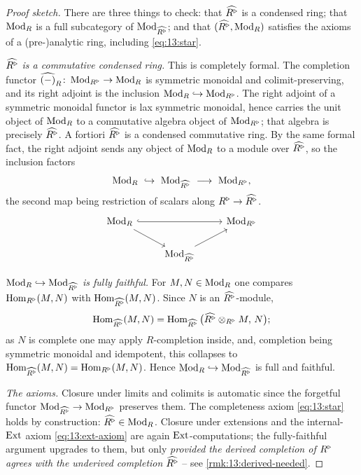 \begin{proof}[Proof sketch]
There are three things to check: that $\widehat{R^{\triangleright}}$ is a condensed ring;
that $\operatorname{Mod}_R$ is a full subcategory of $\operatorname{Mod}_{\widehat{R^{\triangleright}}}$; and that
$(\widehat{R^{\triangleright}},\operatorname{Mod}_R)$ satisfies the axioms of a (pre-)analytic ring,
including \eqref{eq:13:star}.

\emph{$\widehat{R^{\triangleright}}$ is a commutative condensed ring.} This is completely
formal. The completion functor
$\widehat{(-)}_R\colon\operatorname{Mod}_{R^{\triangleright}}\to\operatorname{Mod}_R$ is symmetric monoidal and
colimit-preserving, and its right adjoint is the inclusion
$\operatorname{Mod}_R\hookrightarrow\operatorname{Mod}_{R^{\triangleright}}$. The right adjoint of a symmetric monoidal
functor is lax symmetric monoidal, hence carries the unit object of $\operatorname{Mod}_R$ to a
commutative algebra object of $\operatorname{Mod}_{R^{\triangleright}}$; that algebra is precisely
$\widehat{R^{\triangleright}}$. A fortiori $\widehat{R^{\triangleright}}$ is a condensed commutative ring.
By the same formal fact, the right adjoint sends any object of $\operatorname{Mod}_R$ to a
module over $\widehat{R^{\triangleright}}$, so the inclusion factors
\begin{equation*}
\Mod_R\ \hookrightarrow\ \Mod_{\widehat{\ur R}}\ \longrightarrow\ \Mod_{\ur R},
\end{equation*}
the second map being restriction of scalars along $R^{\triangleright}\to\widehat{R^{\triangleright}}$.
\[
\begin{tikzcd}
\Mod_R \arrow[rr, hook] \arrow[dr] & & \Mod_{\ur R} \\
& \Mod_{\widehat{\ur R}} \arrow[ur] &
\end{tikzcd}
\]

\emph{$\operatorname{Mod}_R\hookrightarrow\operatorname{Mod}_{\widehat{R^{\triangleright}}}$ is fully faithful.} For
$M,N\in\operatorname{Mod}_R$ one compares $\operatorname{Hom}_{R^{\triangleright}}(M,N)$ with
$\operatorname{Hom}_{\widehat{R^{\triangleright}}}(M,N)$. Since $N$ is an $\widehat{R^{\triangleright}}$-module,
\[
\operatorname{Hom}_{\widehat{R^{\triangleright}}}(M,N)=\operatorname{Hom}_{\widehat{R^{\triangleright}}}\big(\widehat{R^{\triangleright}}\otimes_{R^{\triangleright}}M,\,N\big);
\]
as $N$ is complete one may apply $R$-completion inside, and, completion being
symmetric monoidal and idempotent, this collapses to $\operatorname{Hom}_{\widehat{R^{\triangleright}}}(M,N)=\operatorname{Hom}_{R^{\triangleright}}(M,N)$. Hence
$\operatorname{Mod}_R\hookrightarrow\operatorname{Mod}_{\widehat{R^{\triangleright}}}$ is full and faithful.

\emph{The axioms.} Closure under limits and colimits is automatic since the
forgetful functor $\operatorname{Mod}_{\widehat{R^{\triangleright}}}\to\operatorname{Mod}_{R^{\triangleright}}$ preserves them. The
completeness axiom \eqref{eq:13:star} holds by construction:
$\widehat{R^{\triangleright}}\in\operatorname{Mod}_R$. Closure under extensions and the internal-$\operatorname{Ext}$
axiom \eqref{eq:13:ext-axiom} are again $\operatorname{Ext}$-computations; the fully-faithful
argument upgrades to them, but only \emph{provided the derived completion of
$R^{\triangleright}$ agrees with the underived completion} $\widehat{R^{\triangleright}}$ -- see
\cref{rmk:13:derived-needed}.
\end{proof}

